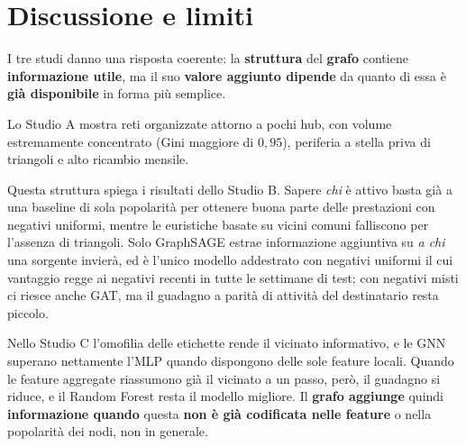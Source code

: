 \documentclass[11pt]{article}
\begin{document}
\section{Discussione e limiti}\label{sec:discussione}

I tre studi danno una risposta coerente: la \textbf{struttura} del \textbf{grafo} contiene
\textbf{informazione utile}, ma il suo \textbf{valore aggiunto dipende} da quanto di essa è
\textbf{già disponibile} in forma più semplice.

Lo Studio A mostra reti organizzate
attorno a pochi hub, con volume estremamente concentrato (Gini maggiore di
$0{,}95$), periferia a stella priva di triangoli e alto ricambio mensile.

\begin{quote}
\end{quote}

Questa struttura spiega i risultati dello Studio B. Sapere \emph{chi} è attivo
basta già a una baseline di sola popolarità per ottenere buona parte delle
prestazioni con negativi uniformi, mentre le euristiche basate su vicini
comuni falliscono per l'assenza di triangoli. Solo GraphSAGE estrae
informazione aggiuntiva su \emph{a chi} una sorgente invierà, ed è
l'unico modello addestrato con negativi uniformi il cui vantaggio regge
ai negativi recenti in tutte le settimane di test; con negativi misti ci
riesce anche GAT, ma il guadagno a parità di attività del destinatario
resta piccolo.

Nello Studio C l'omofilia delle etichette rende il vicinato
informativo, e le GNN superano nettamente l'MLP quando dispongono delle sole
feature locali. Quando le feature aggregate riassumono già il vicinato a un
passo, però, il guadagno si riduce, e il
Random Forest resta il modello migliore. Il \textbf{grafo aggiunge} quindi
\textbf{informazione quando }questa \textbf{non è già codificata nelle feature} o nella
popolarità dei nodi, non in generale.
\end{document}
